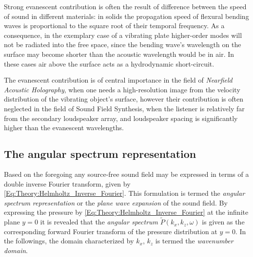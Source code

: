 %
Strong evanescent contribution is often the result of difference between the speed of sound in different materials: in solids the propagation speed of flexural bending waves is proportional to the square root of their temporal frequency. 
As a consequence, in the exemplary case of a vibrating plate higher-order modes will not be radiated into the free space, since the bending wave's wavelength on the surface may become shorter than the acoustic wavelength would be in air. 
In these cases air above the surface acts as a hydrodynamic short-circuit.

%
The evanescent contribution is of central importance in the field of \emph{Nearfield Acoustic Holography}, when one needs a high-resolution image from the velocity distribution of the vibrating object's surface, however their contribution is often neglected in the field of Sound Field Synthesis, when the listener is relatively far from the secondary loudspeaker array, and loudspeaker spacing is significantly higher than the evanescent wavelengths.

%
\subsection{The angular spectrum representation}
\label{Sec:thoery:angular_Spectrum}

Based on the foregoing any source-free sound field may be expressed in terms of a double inverse Fourier transform, given by \eqref{Eq:Theory:Helmholtz_Inverse_Fourier}.
This formulation is termed the \emph{angular spectrum representation} \cite{Ahrens2010phd, Ahrens2012, Williams1999} or the \emph{plane wave expansion} \cite{Spors2005} of the sound field.
By expressing the pressure by \eqref{Eq:Theory:Helmholtz_Inverse_Fourier} at the infinite plane $y=0$ it is revealed that the \emph{angular spectrum} $\tilde{P}(k_x,k_z, \omega)$ is given as the corresponding forward Fourier transform of the pressure distribution at $y=0$.
In the followings, the domain characterized by $k_x$, $k_z$ is termed the \emph{wavenumber domain}.

